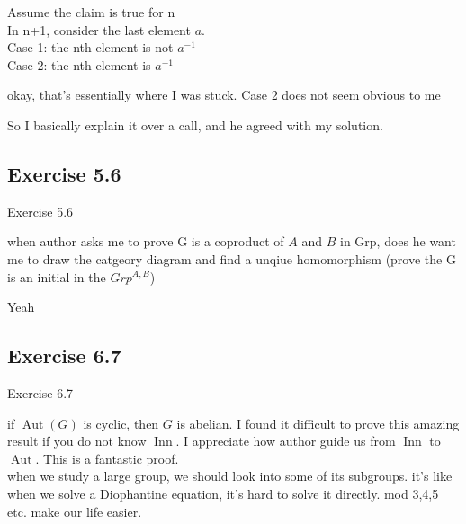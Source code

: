 \documentclass[15pt]{scrartcl}
\begin{document}
\begin{discussion*}
\begin{abboy*}
        Assume the claim is true for n
        \\
        In n+1, consider the last element $a$.
        \\
        Case 1: the nth element is not $a^{-1}$
        \\
        Case 2: the nth element is $a^{-1}$
    \end{abboy*}
    \begin{arthur*}
        okay, that's essentially where I was stuck. Case 2 does not seem obvious to me
    \end{arthur*}
    So I basically explain it over a call, and he agreed with my solution.
\end{discussion*}


\subsection{Exercise 5.6}
\begin{discussion*}Exercise 5.6
    \begin{abboy*}
        when author asks me to prove G is a coproduct of $A$ and $B$ in Grp, does he want me to draw the catgeory diagram and find a unqiue homomorphism (prove the G is an initial in the $Grp^{A,B}$)
    \end{abboy*}
    \begin{arthur*}
        Yeah
    \end{arthur*}
\end{discussion*}


\subsection{Exercise 6.7}
\begin{discussion*}Exercise 6.7
    \begin{abboy*}
        if $\operatorname{Aut}(G) $ is cyclic, then $G$ is abelian. I found it difficult to prove this amazing result if you do not know $\operatorname{Inn}$. I appreciate how author guide us from $\operatorname{Inn}$ to $\operatorname{Aut}$. This is a fantastic proof.
        \\
        when we study a large group, we should look into some of its subgroups. it's like when we solve a Diophantine equation, it's hard to solve it directly. mod 3,4,5 etc. make our life easier.
    \end{abboy*}
\end{discussion*}
\end{document}
